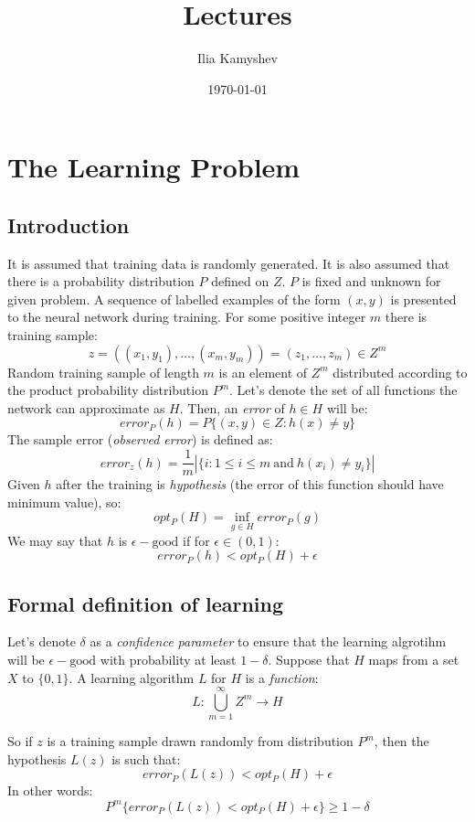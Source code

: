 \documentclass[11pt]{article}
\author{Ilia Kamyshev}
\date{\today}
\title{Lectures}
\begin{document}
\maketitle
\tableofcontents


\section{The Learning Problem}
\label{sec:org4fe85e1}
\subsection{Introduction}
\label{sec:org55a0734}
It is assumed that training data is randomly generated. It is also assumed that there is a probability distribution \(P\) defined on \(Z\). \(P\) is fixed and unknown for given problem. A sequence of labelled examples of the form \((x,y)\) is presented to the neural network during training. For some positive integer \(m\) there is training sample:
\[
    z=((x_1,y_1),\ldots,(x_m,y_m))=(z_1,\ldots,z_m)\in Z^m
\]
Random training sample of length \(m\) is an element of \(Z^m\) distributed according to the product probability distribution \(P^m\).
Let's denote the set of all functions the network can approximate as \(H\). Then, an \emph{error} of \(h\in H\) will be:
\[
    error_P(h)=P\{(x,y)\in Z : h(x)\neq y\}
\]
The sample error (\emph{observed error}) is defined as:
\[
    error_z(h)=\frac{1}{m}|\{i: 1\leq i \leq m\ \text{and}\ h(x_i)\neq y_i\}|
\]
Given \(h\) after the training is \emph{hypothesis} (the error of this function should have minimum value), so:
\[
    opt_P(H) = \inf_{g\in H}error_P(g)
\]
We may say that \(h\) is \(\epsilon-\text{good}\) if for \(\epsilon\in (0,1)\):
\[
    error_P(h) < opt_P(H) + \epsilon 
\]
\subsection{Formal definition of learning}
\label{sec:org1c37238}
Let's denote \(\delta\) as a \emph{confidence parameter} to ensure that the learning algrotihm will be \(\epsilon-\text{good}\) with probability at least \(1-\delta\). 
Suppose that \(H\) maps from a set \(X\) to \(\{0,1\}\). A learning algorithm \(L\) for \(H\) is a \emph{function}:
\[
    L : \bigcup_{m=1}^{\infty}Z^m\rightarrow H
\]

So if \(z\) is a training sample drawn randomly from distribution \(P^m\), then the hypothesis \(L(z)\) is such that:
\[
    error_P(L(z))<opt_P(H) + \epsilon
\]
In other words:
\[
    P^m\{error_P(L(z))<opt_P(H)+\epsilon\}\geq 1 - \delta
\]
\end{document}
